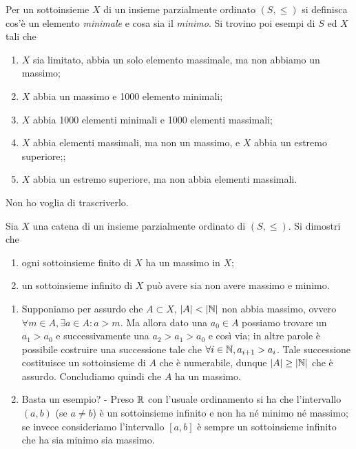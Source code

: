 \begin{es}
  Per un sottoinsieme $ X $ di un insieme parzialmente ordinato $ (S, \leq) $ si definisca cos'è un elemento \emph{minimale} e cosa sia il \emph{minimo}. Si trovino poi esempi di $ S $ ed $ X $ tali che
  \begin{enumerate}
  \item $ X $ sia limitato, abbia un solo elemento massimale, ma non abbiamo un massimo;
  \item $ X $ abbia un massimo e 1000 elemento minimali;
  \item $ X $ abbia 1000 elementi minimali e 1000 elementi massimali;
  \item $ X $ abbia elementi massimali, ma non un massimo, e $ X $ abbia un estremo superiore;;
  \item $ X $ abbia un estremo superiore, ma non abbia elementi massimali.
  \end{enumerate}
\end{es}
Non ho voglia di trascriverlo.

\begin{es}
  Sia $ X $ una catena di un insieme parzialmente ordinato di $ (S, \leq) $. Si dimostri che
  \begin{enumerate}
  \item ogni sottoinsieme finito di $ X $ ha un massimo in $ X $;
  \item un sottoinsieme infinito di $ X $ può avere sia non avere massimo e minimo.
  \end{enumerate}
\end{es}
\begin{enumerate}
\item Supponiamo per assurdo che $ A \subset X $, $ |A| < |\mathbb{N}| $ non abbia massimo, ovvero $ \forall m \in A, \exists a \in A : a > m $. Ma allora dato una $ a_0 \in A $ possiamo trovare un $ a_1 > a_0 $ e successivamente una $ a_2 > a_1 > a_0 $ e così via; in altre parole è possibile costruire una successione tale che $ \forall i \in \mathbb{N}, a_{i + 1} > a_i $. Tale successione costituisce un sottoinsieme di $ A $ che è numerabile, dunque $ |A| \geq |\mathbb{N}| $ che è assurdo. Concludiamo quindi che $ A $ ha un massimo.
\item \textsf{Basta un esempio? - Preso $ \mathbb{R} $ con l'usuale ordinamento si ha che l'intervallo $ (a, b) $ (se $ a \neq b $) è un sottoinsieme infinito e non ha né minimo né massimo; se invece consideriamo l'intervallo $ [a, b] $ è sempre un sottoinsieme infinito che ha sia minimo sia massimo.}
\end{enumerate}

